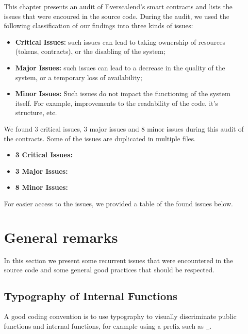 
This chapter presents an audit of Everscalend's smart contracts and lists the issues that were encoured in the source code. During the audit, we used the following classification of our findings into three kinds of issues:

\begin{itemize}
  \item {\bf Critical Issues:} such issues can lead to taking ownership of resources (tokens, contracts), or the disabling of the system;
  \item {\bf Major Issues:} such issues can lead to a decrease in the quality of the system, or a temporary loss of availability;
  \item {\bf Minor Issues:} Such issues do not impact the functioning of the system itself. For example, improvements to the readability of the code, it's structure, etc.
\end{itemize}

We found 3 critical issues, 3 major issues and 8 minor issues during this audit of the contracts. Some of the issues are duplicated in multiple files.

\begin{itemize}
\item {\bf 3 Critical Issues:}
\item {\bf 3 Major Issues:}
\item {\bf 8 Minor Issues:}
\end{itemize}

For easier access to the issues, we provided a table of the found issues below.


\begingroup
  \pagestyle{plain}
  \begin{figure}[H]
    \listoffigures
  \end{figure}
\endgroup


\section{General remarks}

In this section we present some recurrent issues that were encountered in the source code and some general good practices that should be respected. 

\subsection{Typography of Internal Functions}
\label{readability:internal}

A good coding convention is to use typography to visually discriminate public functions and internal functions, for example using a prefix such as {\tt \_}.

